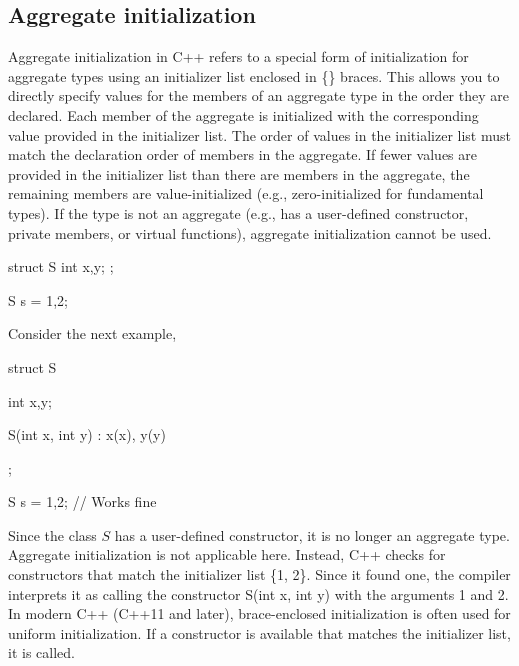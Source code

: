 \documentclass{report}
\begin{document}
    \subsection{Aggregate initialization}
    \bigbreak \noindent 
    Aggregate initialization in C++ refers to a special form of initialization for aggregate types using an initializer list enclosed in \{\} braces. This allows you to directly specify values for the members of an aggregate type in the order they are declared.
    \bigbreak \noindent 
    Each member of the aggregate is initialized with the corresponding value provided in the initializer list. The order of values in the initializer list must match the declaration order of members in the aggregate.
    \bigbreak \noindent 
    If fewer values are provided in the initializer list than there are members in the aggregate, the remaining members are value-initialized (e.g., zero-initialized for fundamental types).
    \bigbreak \noindent 
    If the type is not an aggregate (e.g., has a user-defined constructor, private members, or virtual functions), aggregate initialization cannot be used.
    \bigbreak \noindent 
    \begin{cppcode}
        struct S {
            int x,y;
        };

        S s = {1,2};
    \end{cppcode}
    \bigbreak \noindent 
    Consider the next example,
    \bigbreak \noindent 
    \begin{cppcode}
        struct S {
            int x,y;

            S(int x, int y) : x(x), y(y) {}
        };
         
        S s = {1,2}; // Works fine
    \end{cppcode}
    \bigbreak \noindent 
    Since the class $S$ has a user-defined constructor, it is no longer an aggregate type.
    \bigbreak \noindent 
    Aggregate initialization is not applicable here. Instead, C++ checks for constructors that match the initializer list \{1, 2\}.
    \bigbreak \noindent 
    Since it found one, the compiler interprets it as calling the constructor S(int x, int y) with the arguments 1 and 2.
    \bigbreak \noindent 
    In modern C++ (C++11 and later), brace-enclosed initialization is often used for uniform initialization.
    \bigbreak \noindent 
    If a constructor is available that matches the initializer list, it is called.

    \bigbreak \noindent 
\end{document}
